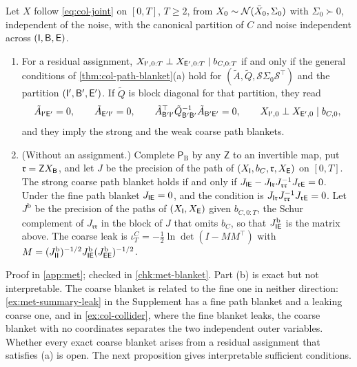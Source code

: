 \begin{theorem}\label{thm:met-coarse-blanket}
Let $X$ follow \eqref{eq:col-joint} on $[0,T]$, $T\ge2$, from $X_0\sim\mathcal{N}(\bar X_0,\Sigma_0)$ with $\Sigma_0\succ0$, independent of the noise, with the canonical partition of $C$ and noise independent across $(\mathsf{I},\mathsf{B},\mathsf{E})$.
\begin{enumerate}
\item[(a)] For a residual assignment, $X_{\mathsf{I}',0:T}\perp X_{\mathsf{E}',0:T}\mid b_{C,0:T}$ if and only if the general conditions of \cref{thm:col-path-blanket}(a) hold for $(\tilde A,\tilde Q,\mathcal S\Sigma_0\mathcal S^\top)$ and the partition $(\mathsf{I}',\mathsf{B}',\mathsf{E}')$. If $\tilde Q$ is block diagonal for that partition, they read
\begin{equation}\label{eq:met-coarse-pb}
\tilde A_{\mathsf{I}'\mathsf{E}'}=0,\qquad\tilde A_{\mathsf{E}'\mathsf{I}'}=0,\qquad\tilde A_{\mathsf{B}'\mathsf{I}'}^\top\tilde Q_{\mathsf{B}'\mathsf{B}'}^{-1}\tilde A_{\mathsf{B}'\mathsf{E}'}=0,\qquad X_{\mathsf{I}',0}\perp X_{\mathsf{E}',0}\mid b_{C,0},
\end{equation}
and they imply the strong and the weak coarse path blankets.
\item[(b)] (Without an assignment.) Complete $\mathsf P_{\mathrm B}$ by any $\mathsf Z$ to an invertible map, put $\mathfrak r=\mathsf ZX_{\mathsf{B}}$, and let $J$ be the precision of the path of $(X_{\mathsf{I}},b_C,\mathfrak r,X_{\mathsf{E}})$ on $[0,T]$. The strong coarse path blanket holds if and only if $J_{\mathsf{I}\mathsf{E}}-J_{\mathsf{I}\mathfrak r}J_{\mathfrak r\mathfrak r}^{-1}J_{\mathfrak r\mathsf{E}}=0$. Under the fine path blanket $J_{\mathsf{I}\mathsf{E}}=0$, and the condition is $J_{\mathsf{I}\mathfrak r}J_{\mathfrak r\mathfrak r}^{-1}J_{\mathfrak r\mathsf{E}}=0$. Let $J^{\mathrm b}$ be the precision of the paths of $(X_{\mathsf{I}},X_{\mathsf{E}})$ given $b_{C,0:T}$, the Schur complement of $J_{\mathfrak r\mathfrak r}$ in the block of $J$ that omits $b_C$, so that $J^{\mathrm b}_{\mathsf{I}\mathsf{E}}$ is the matrix above. The coarse leak is $\iota^C_T=-\frac12\ln\det(I-MM^\top)$ with $M=(J^{\mathrm b}_{\mathsf{I}\mathsf{I}})^{-1/2}J^{\mathrm b}_{\mathsf{I}\mathsf{E}}(J^{\mathrm b}_{\mathsf{E}\mathsf{E}})^{-1/2}$.
\end{enumerate}
\end{theorem}
Proof in \cref{app:met}; checked in \cref{chk:met-blanket}. Part (b) is exact but not interpretable. The coarse blanket is related to the fine one in neither direction: \cref{ex:met-summary-leak} in the Supplement has a fine path blanket and a leaking coarse one, and in \cref{ex:col-collider}, where the fine blanket leaks, the coarse blanket with no coordinates separates the two independent outer variables. Whether every exact coarse blanket arises from a residual assignment that satisfies (a) is open. The next proposition gives interpretable sufficient conditions.

